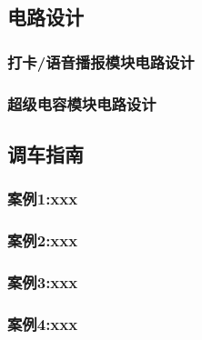 \subsection{电路设计}
\subsubsection{打卡/语音播报模块电路设计}
\subsubsection{超级电容模块电路设计}




\subsection{调车指南}
\subsubsection{案例1:xxx}
\subsubsection{案例2:xxx}
\subsubsection{案例3:xxx}
\subsubsection{案例4:xxx}




